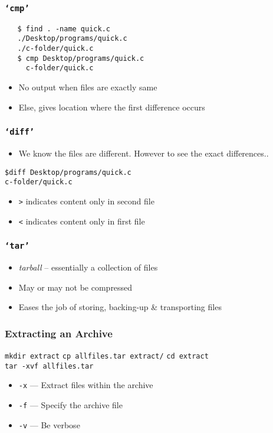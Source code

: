 \documentclass[17pt,compress]{beamer}
\begin{document}
\begin{frame}[fragile]
  \frametitle{\texttt{`cmp'}}
  \begin{lstlisting}
   $ find . -name quick.c
   ./Desktop/programs/quick.c
   ./c-folder/quick.c
   $ cmp Desktop/programs/quick.c 
     c-folder/quick.c
  \end{lstlisting} %
  \begin{itemize}
  \item No output when files are exactly same
  \item Else, gives location where the first difference occurs 
  \end{itemize}
\end{frame}

\begin{frame}[fragile]
  \frametitle{\texttt{`diff'}}
  \begin{itemize}
  \item We know the files are different. However to see the exact differences..
  \end{itemize}
\hspace{30pt}\verb~$diff Desktop/programs/quick.c ~\\
\hspace{40pt}\verb~c-folder/quick.c~
 
  \begin{itemize}
  \item \texttt{>} indicates content only in second file
  \item \texttt{<} indicates content only in first file
  \end{itemize}
\end{frame}

\begin{frame}[fragile]
\frametitle{\texttt{`tar'}}
\begin{itemize}
\item \emph{tarball} -- essentially a collection of files
\item May or may not be compressed
\item Eases the job of storing, backing-up \& transporting files
\end{itemize}
\end{frame}

\begin{frame}[fragile]
\frametitle{Extracting an Archive}
\verb~mkdir extract~
\verb~cp allfiles.tar extract/~
\verb~cd extract~\\
\verb~tar -xvf allfiles.tar~


\begin{itemize}
\item \texttt{-x} --- Extract files within the archive
\item \texttt{-f} --- Specify the archive file
\item \texttt{-v} --- Be verbose
\end{itemize}
\end{frame}
\end{document}
